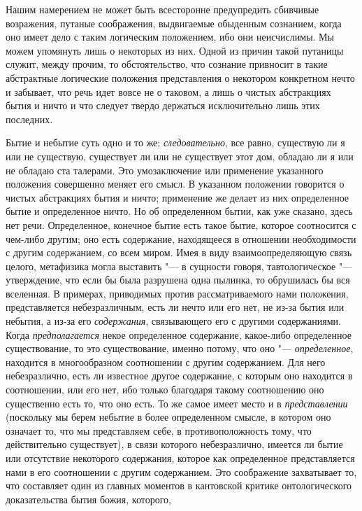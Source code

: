 Нашим намерением не может быть всесторонне предупредить сбивчивые
возражения, путаные соображения, выдвигаемые обыденным сознанием, когда оно
имеет дело с таким логическим положением, ибо они неисчислимы. Мы можем
упомянуть лишь о некоторых из них. Одной из причин такой путаницы служит,
между прочим, то обстоятельство, что сознание привносит в такие абстрактные
логические положения представления о некотором конкретном нечто и забывает,
что речь идет вовсе не о таковом, а лишь о чистых абстракциях бытия и ничто
и что следует твердо держаться исключительно лишь этих последних.

Бытие и небытие суть одно и то же; {\em следовательно},
все равно, существую ли я или не существую, существует ли или не существует
этот дом, обладаю ли я или не обладаю ста талерами. Это умозаключение или
применение указанного положения совершенно меняет его смысл. В указанном
положении говорится о чистых абстракциях бытия и ничто; применение же
делает из них определенное бытие и определенное ничто. Но об определенном
бытии, как уже сказано, здесь нет речи. Определенное, конечное бытие есть
такое бытие, которое соотносится с чем-либо другим; оно есть содержание,
находящееся в отношении необходимости с другим содержанием, со всем миром.
Имея в виду взаимоопределяющую связь целого, метафизика могла выставить "--- в
сущности говоря, тавтологическое "--- утверждение, что если бы была разрушена
одна пылинка, то обрушилась бы вся вселенная. В примерах, приводимых против
рассматриваемого нами положения, представляется небезразличным, есть ли
нечто или его нет, не из-за бытия или небытия, а из-за его
{\em содержания}, связывающего его с другими
содержаниями. Когда {\em предполагается} некое
определенное содержание, какое-либо определенное существование, то это
существование, именно потому, что оно
"--- {\em определенное}, находится в многообразном
соотношении с другим содержанием. Для него небезразлично, есть ли известное
другое содержание, с которым оно находится в соотношении, или его нет, ибо
только благодаря такому соотношению оно существенно есть то, что оно есть.
То же самое имеет место и в {\em представлении}
(поскольку мы берем небытие в более определенном смысле, в котором оно
означает то, что мы представляем себе, в противоположность тому, что
действительно существует), в связи которого небезразлично, имеется ли бытие
или отсутствие некоторого содержания, которое как определенное
представляется нами в его соотношении с другим содержанием.
\label{bkm:bm85a}
Это соображение захватывает то, что составляет один из главных моментов в
кантовской критике онтологического доказательства бытия божия, которого,
